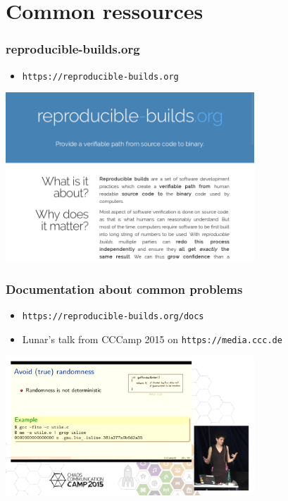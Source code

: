 \documentclass[14pt]{beamer}
\begin{document}
\section{Common ressources}

\begin{frame}
 \frametitle{reproducible-builds.org}

 \begin{itemize}
  \item \texttt{https://reproducible-builds.org}
 \end{itemize}
 \begin{center}
 \includegraphics[width=0.7\textwidth]{images/rbwww1.png}
 \end{center}
\end{frame}

\begin{frame}
 \frametitle{Documentation about common problems}

 \begin{itemize}
  \item \texttt{https://reproducible-builds.org/docs}
  \item Lunar's talk from CCCamp 2015 on
  \texttt{https://media.ccc.de}
 \end{itemize}
 \begin{center}
 \includegraphics[width=0.7\textwidth]{images/cccamp2015_lunar_random.png}
 \end{center}
\end{frame}
\end{document}
